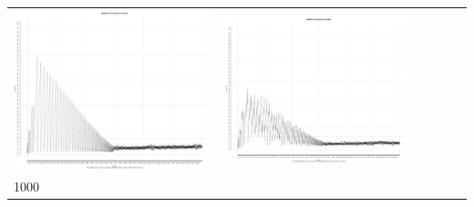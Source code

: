 \begin{table}[htbp]
{\begin{tabular}{l | ccccc}
\begin{minipage}{.15\textwidth}
     			 	\includegraphics[width=\linewidth]{images/mema-triple/N7}
    				 \end{minipage}
    			   &	 \begin{minipage}{.15\textwidth}
     			 	\includegraphics[width=\linewidth]{images/mema-triple/N10}
    				 \end{minipage}\\	
		1000   &	 \begin{minipage}{.15\textwidth}

\end{minipage}
\end{tabular}}
\end{table}
